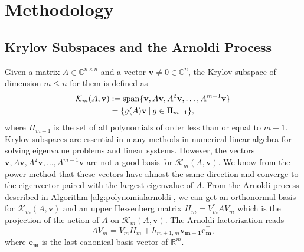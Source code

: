 \section{Methodology}
\label{sec:methods}

\subsection{Krylov Subspaces and the Arnoldi Process}\label{sec:arnoldi}
Given a matrix $A \in \mathbb{C}^{n \times n}$ and a vector $\mathbf{v} \neq 0 \in \mathbb{C}^n$,
the Krylov subspace of dimension $m \leq n$ for them is defined \cite{golub2013matrix} as
\begin{equation}
    \label{eq:krylovsubspacedefinition}
    \begin{aligned}
        \mathcal{K}_m(A, \mathbf{v})
        & :=\operatorname{span}\{\mathbf{v}, A\mathbf{v}, A^{2}\mathbf{v}, \dots, A^{m-1}\mathbf{v} \}\\
         & = \{g(A)\mathbf{v} \:|\: g \in \Pi_{m-1} \},
    \end{aligned}
\end{equation}
where $\Pi_{m-1}$ is the set of all polynomials of order less than or equal to $m-1$.
Krylov subspaces are essential in many methods in numerical linear algebra
for solving eigenvalue problems and linear systems.
However, the vectors $\mathbf{v}, A\mathbf{v}, A^{2}\mathbf{v}, \dots, A^{m-1}\mathbf{v}$
are not a good basis for $\mathcal{K}_m(A, \mathbf{v})$. We know from the power method that
these vectors have almost the same direction and converge to the eigenvector paired
with the largest eigenvalue of $A$.
From the Arnoldi process \cite{trefethen1997numerical} described in Algorithm
\ref{alg:polynomialarnoldi}, we can get an orthonormal basis for $\mathcal{K}_m(A, \mathbf{v})$
and an upper Hessenberg matrix $H_m = V_m^* A V_m$ which is the projection of the action of
$A$ on $\mathcal{K}_m(A, \mathbf{v})$. The Arnoldi factorization reads
\begin{equation}
    \label{eq:arnoldifactorization}
    A V_m = V_m H_m + h_{m+1, m} \mathbf{v_{m+1}} \mathbf{e_m^\top},
\end{equation}
where $\mathbf{e_m}$ is the last canonical basis vector of $\mathbb{R}^{m}$.

